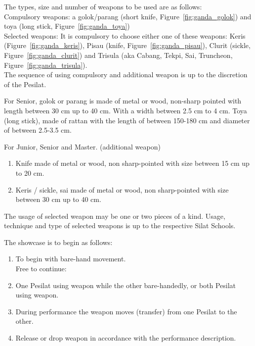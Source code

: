 \begin{legal}
\begin{legal}
        \begin{legal}
        \item The types, size and number of weapons to be used are as follows: \\ 
        
            Compulsory weapons: a golok/parang (short knife, Figure~\ref{fig:ganda_golok}) and 
            toya (long stick, Figure~\ref{fig:ganda_toya}) \\

            Selected weapons: It is compulsory to choose either one of these weapons: Keris (Figure~\ref{fig:ganda_keris}), 
            Pisau (knife, Figure~\ref{fig:ganda_pisau}), Clurit (sickle, Figure~\ref{fig:ganda_clurit}) and 
            Trisula (aka Cabang, Tekpi, Sai, Truncheon, Figure~\ref{fig:ganda_trisula}). \\

            The sequence of using compulsory and additional weapon is up to the discretion of the Pesilat.

        \item  For Senior, golok or parang is made of metal or wood, non-sharp pointed with length between 30 cm up 
               to 40 cm. With a width between 2.5 cm to 4 cm. Toya (long stick), made of rattan with the length of 
               between 150-180 cm and diameter of between 2.5-3.5 cm.

        \item For Junior, Senior and Master. (additional weapon)

            \begin{enumerate}[label=\alph*.]
            \item Knife made of metal or wood, non sharp-pointed with size between 15 cm up to 20 cm.
            \item Keris / sickle, sai made of metal or wood, non sharp-pointed with size between 30 cm up to 40 cm.
            \end{enumerate}

        \item The usage of selected weapon may be one or two pieces of a kind. Usage, technique and type of 
              selected weapons is up to the respective Silat Schools.

        \item The showcase is to begin as follows:
            \begin{enumerate}[label=\alph*.]
            \item To begin with bare-hand movement. \\
                  Free to continue:
            \item One Pesilat using weapon while the other bare-handedly, or both Pesilat using weapon.
            \item During performance the weapon moves (transfer) from one Pesilat to the other.
            \item Release or drop weapon in accordance with the performance description.
            \end{enumerate}


\end{legal}
\end{legal}
\end{legal}
